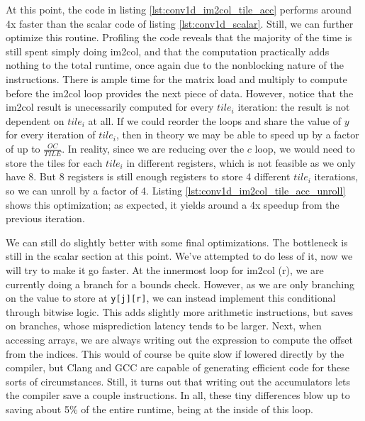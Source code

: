 \documentclass[acmsmall, nonacm=true]{acmart}
\begin{document}
At this point, the code in listing \ref{lst:conv1d_im2col_tile_acc} performs around 4x faster than the scalar code of listing \ref{lst:conv1d_scalar}. Still, we can further optimize this routine. Profiling the code reveals that the majority of the time is still spent simply doing im2col, and that the computation practically adds nothing to the total runtime, once again due to the nonblocking nature of the instructions. There is ample time for the matrix load and multiply to compute before the im2col loop provides the next piece of data. However, notice that the im2col result is unecessarily computed for every $tile_i$ iteration: the result is not dependent on $tile_i$ at all. If we could reorder the loops and share the value of $y$ for every iteration of $tile_i$, then in theory we may be able to speed up by a factor of up to $\frac{OC}{TILE}$. In reality, since we are reducing over the $c$ loop, we would need to store the tiles for each $tile_i$ in different registers, which is not feasible as we only have 8. But 8 registers is still enough registers to store 4 different $tile_i$ iterations, so we can unroll by a factor of 4. Listing \ref{lst:conv1d_im2col_tile_acc_unroll} shows this optimization; as expected, it yields around a 4x speedup from the previous iteration.

We can still do slightly better with some final optimizations. The bottleneck is still in the scalar section at this point. We've attempted to do less of it, now we will try to make it go faster. At the innermost loop for im2col (r), we are currently doing a branch for a bounds check. However, as we are only branching on the value to store at \verb|y[j][r]|, we can instead implement this conditional through bitwise logic. This adds slightly more arithmetic instructions, but saves on branches, whose misprediction latency tends to be larger. Next, when accessing arrays, we are always writing out the expression to compute the offset from the indices. This would of course be quite slow if lowered directly by the compiler, but Clang and GCC are capable of generating efficient code for these sorts of circumstances. Still, it turns out that writing out the accumulators lets the compiler save a couple instructions. In all, these tiny differences blow up to saving about 5\% of the entire runtime, being at the inside of this loop. 
\end{document}

